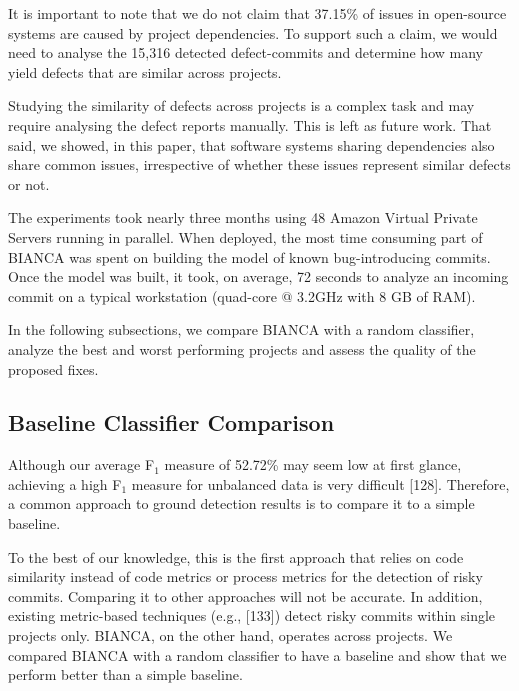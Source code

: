 \documentclass[12pt]{report}
\begin{document}
It is important to note that we do not claim that 37.15\% of issues in
open-source systems are caused by project dependencies. To support such
a claim, we would need to analyse the 15,316 detected defect-commits and
determine how many yield defects that are similar across projects.

Studying the similarity of defects across projects is a complex task and
may require analysing the defect reports manually. This is left as
future work. That said, we showed, in this paper, that software systems
sharing dependencies also share common issues, irrespective of whether
these issues represent similar defects or not.

The experiments took nearly three months using 48 Amazon Virtual Private
Servers running in parallel. When deployed, the most time consuming part
of BIANCA was spent on building the model of known bug-introducing
commits. Once the model was built, it took, on average, 72 seconds to
analyze an incoming commit on a typical workstation (quad-core @ 3.2GHz
with 8 GB of RAM).

In the following subsections, we compare BIANCA with a random
classifier, analyze the best and worst performing projects and assess
the quality of the proposed fixes.

\subsection{Baseline Classifier
Comparison}\label{baseline-classifier-comparison}

Although our average F\(_1\) measure of 52.72\% may seem low at first
glance, achieving a high F\(_1\) measure for unbalanced data is very
difficult {[}128{]}. Therefore, a common approach to ground detection
results is to compare it to a simple baseline.

To the best of our knowledge, this is the first approach that relies on
code similarity instead of code metrics or process metrics for the
detection of risky commits. Comparing it to other approaches will not be
accurate. In addition, existing metric-based techniques (e.g.,
{[}133{]}) detect risky commits within single projects only. BIANCA, on
the other hand, operates across projects. We compared BIANCA with a
random classifier to have a baseline and show that we perform better
than a simple baseline.
\end{document}
